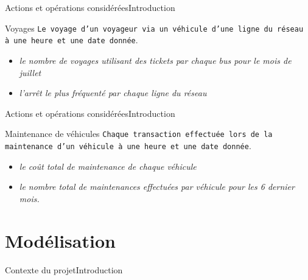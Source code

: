 \documentclass[a4paper,12pt,usenames,dvipsnames]{beamer}
\begin{document}
\begin{frame}{Actions et opérations considérées}{Introduction}
  \begin{block}{Voyages}
    \texttt{Le voyage d'un voyageur via un véhicule d'une ligne du réseau à une heure et une date donnée}.
  \end{block}

  \begin{examples}
    \begin{itemize}
      \item<1-> \textit{le nombre de voyages utilisant des tickets par chaque bus pour le mois de juillet}
      \item<2-> \textit{l'arrêt le plus fréquenté par chaque ligne du réseau}
    \end{itemize}
  \end{examples}
\end{frame}

\begin{frame}{Actions et opérations considérées}{Introduction}
  \begin{block}{Maintenance de véhicules}
    \texttt{Chaque transaction effectuée lors de la maintenance d'un véhicule à une heure et une date donnée}.
  \end{block}

  \begin{examples}
    \begin{itemize}
      \item<1-> \textit{le coût total de maintenance de chaque véhicule}
      \item<2-> \textit{le nombre total de maintenances effectuées par véhicule pour les 6 dernier mois.}
    \end{itemize}
  \end{examples}
\end{frame}

\section{Modélisation}
\begin{frame}{Contexte du projet}{Introduction}
\end{frame}
\end{document}
